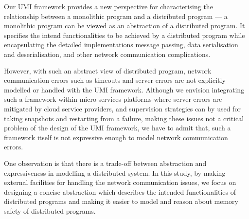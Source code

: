 Our UMI framework provides a new perspective for characterising the relationship between a monolithic program and a distributed program --- a monolithic program can be viewed as an abstraction of a distributed program. It specifies the intend functionalities to be achieved by a distributed program while encapsulating the detailed implementations message passing, data serialisation and deserialisation, and other network communication complications.

However, with such an abstract view of distributed program, network communication errors such as timeouts and server errors are not explicitly modelled or handled with the UMI framework. Although we envision integrating such a framework within micro-services platforms where server errors are mitigated by cloud service providers, and supervision strategies can by used for taking snapshots and restarting from a failure, making these issues not a critical problem of the design of the UMI framework, we have to admit that, such a framework itself is not expressive enough to model network communication errors.

One observation is that there is a trade-off between abstraction and expressiveness in modelling a distributed system. In this study, by making external facilities for handling the network communication issues, we focus on designing a concise abstraction which describes the intended functionalities of distributed programs and making it easier to model and reason about memory safety of distributed programs.

